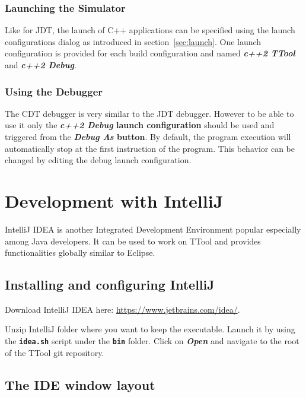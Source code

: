 \documentclass[12pt]{article}
\begin{document}
\subsubsection{Launching the Simulator}

Like for JDT, the launch of C++ applications can be specified using the launch
configurations dialog as introduced in section~\ref{sec:launch}. One launch
configuration is provided for each build configuration and named
\textbf{\textit{c++2 TTool}} and \textbf{\textit{c++2 Debug}}.

\subsubsection{Using the Debugger}

The CDT debugger is very similar to the JDT debugger. However to be able to use
it only the \textbf{\textit{c++2 Debug} launch configuration} should be used and
triggered from the \textbf{\textit{Debug As} button}. By default, the program execution
will automatically stop at the first instruction of the program. This behavior
can be changed by editing the debug launch configuration.

\newpage

\section{Development with IntelliJ}

IntelliJ IDEA is another Integrated Development Environment popular especially
among Java developers. It can be used to work on TTool and provides
functionalities globally similar to Eclipse.

\subsection{Installing and configuring IntelliJ}

Download IntelliJ IDEA here: \url{https://www.jetbrains.com/idea/}.

Unzip IntelliJ folder where you want to keep the executable. Launch it by using
the \textbf{\texttt{idea.sh}} script under the \textbf{\texttt{bin}} folder. Click on \textbf{\emph{Open}}
and navigate to the root of the TTool git repository.

\subsection{The IDE window layout}
\end{document}

